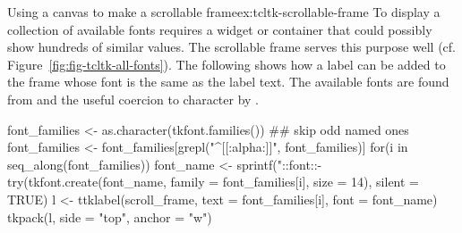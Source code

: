 \begin{example}{Using a canvas to make a scrollable frame}{ex:tcltk-scrollable-frame}
To display a collection of available fonts requires a widget or
container that could possibly show hundreds of similar values. The
scrollable frame serves this purpose well
(cf. Figure~\ref{fig:fig-tcltk-all-fonts}).  The following shows how a
label can be added to the frame whose font is the same as the label
text. The available fonts are found from 
and the useful coercion to character by .
\begin{Schunk}
\begin{Sinput}
 font_families <- as.character(tkfont.families())
 ## skip odd named ones
 font_families <- font_families[grepl("^[[:alpha:]]", font_families)] 
 for(i in seq_along(font_families)) {
   font_name <- sprintf("::font::-%
   try(tkfont.create(font_name, family = font_families[i], size = 14), 
       silent = TRUE)
   l <- ttklabel(scroll_frame, text = font_families[i], font = font_name)
   tkpack(l, side = "top", anchor = "w")
 }
\end{Sinput}
\end{Schunk}

\end{example}

